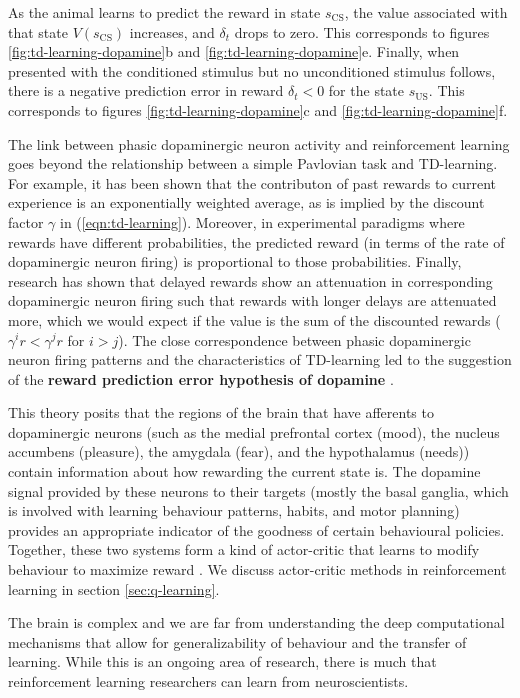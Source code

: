 \documentclass[journal, onecolumn, 12pt, draftclsnofoot]{IEEEtran}
\newcommand{\kword}[1]{\textbf{#1}}
\begin{document}
		As the animal learns to predict the reward in state $s_\text{CS}$, the value associated with that state $V(s_\text{CS})$ increases, and $\delta_t$ drops to zero. This corresponds to figures \ref{fig:td-learning-dopamine}b and \ref{fig:td-learning-dopamine}e. Finally, when presented with the conditioned stimulus but no unconditioned stimulus follows, there is a negative prediction error in reward $\delta_t < 0$ for the state $s_{\text{US}}$. This corresponds to figures \ref{fig:td-learning-dopamine}c and \ref{fig:td-learning-dopamine}f.
		\par The link between phasic dopaminergic neuron activity and reinforcement learning goes beyond the relationship between a simple Pavlovian task and TD-learning. For example, it has been shown that the contributon of past rewards to current experience is an exponentially weighted average, as is implied by the discount factor $\gamma$ in (\ref{eqn:td-learning}). Moreover, in experimental paradigms where rewards have different probabilities, the predicted reward (in terms of the rate of dopaminergic neuron firing) is proportional to those probabilities. Finally, research has shown that delayed rewards show an attenuation in corresponding dopaminergic neuron firing such that rewards with longer delays are attenuated more, which we would expect if the value is the sum of the discounted rewards ($\gamma^i r < \gamma^j r$ for $i>j$). The close correspondence between phasic dopaminergic neuron firing patterns and the characteristics of TD-learning led to the suggestion of the \kword{reward prediction error hypothesis of dopamine} \cite{brain}.
		\par This theory posits that the regions of the brain that have afferents to dopaminergic neurons (such as the medial prefrontal cortex (mood), the nucleus accumbens (pleasure), the amygdala (fear), and the hypothalamus (needs)) contain information about how rewarding the current state is. The dopamine signal provided by these neurons to their targets (mostly the basal ganglia, which is involved with learning behaviour patterns, habits, and motor planning) provides an appropriate indicator of the goodness of certain behavioural policies. Together, these two systems form a kind of actor-critic that learns to modify behaviour to maximize reward \cite{brain}. We discuss actor-critic methods in reinforcement learning in section \ref{sec:q-learning}.
		\par The brain is complex and we are far from understanding the deep computational mechanisms that allow for generalizability of behaviour and the transfer of learning. While this is an ongoing area of research, there is much that reinforcement learning researchers can learn from neuroscientists.
\end{document}
